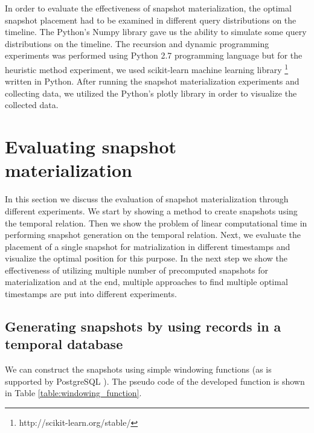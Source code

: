 		In order to evaluate the effectiveness of snapshot materialization, the optimal snapshot placement had to be examined in different query distributions on the timeline. The Python's Numpy library gave us the ability to simulate some query distributions on the timeline. The recursion and dynamic programming experiments was performed using Python 2.7 programming language but for the heuristic method experiment, we used scikit-learn machine learning library \footnote{http://scikit-learn.org/stable/} written in Python. After running the snapshot materialization experiments and collecting data, we utilized the Python's plotly library in order to visualize the collected data.


	\section{Evaluating snapshot materialization} \label{sec:evaluation_of_snapshot_materialization}
		In this section we discuss the evaluation of snapshot materialization through different experiments. We start by showing a method to create snapshots using the temporal relation. Then we show the problem of linear computational time in performing snapshot generation on the temporal relation. Next, we evaluate the placement of a single snapshot for matrialization in different timestamps and visualize the optimal position for this purpose. In the next step we show the effectiveness of utilizing multiple number of precomputed snapshots for materialization and at the end, multiple approaches to find multiple optimal timestamps are put into different experiments.

		\subsection {Generating snapshots by using records in a temporal database} \label{sec:snapshot_generation}
			We can construct the snapshots using simple windowing functions (as is supported by PostgreSQL \cite{momjian2001postgresql}). The pseudo code of the developed function is shown in Table \ref{table:windowing_function}. 

